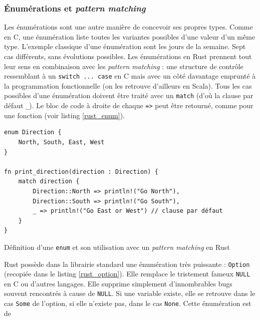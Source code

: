 \subsubsection{Énumérations et \textit{pattern matching}}\label{rust_enum_pattern_matching}
Les énumérations sont une autre manière de concevoir ses propres types. Comme en C, une énumération
liste toutes les variantes possibles d'une valeur d'un même type. L'exemple classique d'une énumération 
sont les jours de la semaine. Sept cas différents, sans évolutions possibles. Les énumérations en 
Rust prennent tout leur sens en combinaison avec les \textit{pattern matching} : une structure 
de contrôle ressemblant à un \texttt{switch ... case} en C mais avec un côté davantage 
emprunté à la programmation fonctionnelle (on les retrouve d'ailleurs en Scala). Tous les cas 
possibles d'une énumération doivent être traité avec un \texttt{match} (d'où la clause 
par défaut \texttt{_}). Le bloc de code à droite de chaque \texttt{=>} peut être 
retourné, comme pour une fonction (voir listing \ref{rust_enum}).
\bigbreak
\begin{code}
    \begin{verbatim}
enum Direction {
    North, South, East, West
}

fn print_direction(direction : Direction) {
    match direction {
        Direction::North => println!("Go North"),
        Direction::South => println!("Go South"),
        _ => println!("Go East or West") // clause par défaut
    }
}
    \end{verbatim}
    \caption{Définition d'une \texttt{enum} et son utilisation avec un \textit{pattern matching} en Rust}
    \label{rust_enum}
\end{code}
\bigbreak
Rust possède dans la librairie standard une énumération très puissante : \texttt{Option} 
(recopiée dans le listing \ref{rust_option}). Elle remplace le tristement fameux \texttt{NULL} 
en C ou d'autres langages. Elle supprime simplement d'innombrables bugs souvent rencontrés à cause 
de \texttt{NULL}. Si une variable existe, elle se retrouve dans le cas \texttt{Some} 
de l'option, si elle n'existe pas, dans le cas \texttt{None}. Cette énumération est de 
